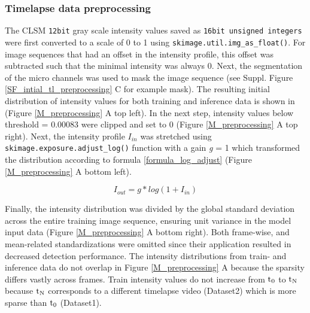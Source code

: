 \subsubsection{Timelapse data preprocessing}
The CLSM \verb|12bit| gray scale intensity values saved as 
\verb|16bit unsigned integers| were first converted to a scale of 0 to 1 using 
\verb|skimage.util.img_as_float()|. For image sequences that had an offset in 
the intensity profile, this offset was subtracted such that the minimal 
intensity was always 0. Next, the segmentation of the micro channels 
was used to mask the image sequence (see Suppl. Figure 
\ref{SF_intial_tl_preprocessing} C for example mask). The resulting initial 
distribution of intensity values for both training and inference data is shown 
in  (Figure \ref{M_preprocessing} A top left). In the next step, intensity 
values below threshold = 0.00083 were clipped and set to 0 (Figure 
\ref{M_preprocessing} A top right). Next, the intensity profile $I_{in}$ was 
stretched using \verb|skimage.exposure.adjust_log()| function with a 
gain  \textit{g} = 1 which transformed the distribution according to formula 
\ref{formula_log_adjust} (Figure \ref{M_preprocessing} A bottom left). 

\begin{equation}
    I_{out} = g*log(1 + I_{in})
    \label{formula_log_adjust}
\end{equation}

Finally, the intensity distribution was divided by the global standard deviation
across the entire training image sequence, ensuring unit variance in the model
input data (Figure \ref{M_preprocessing} A bottom right). Both frame-wise, and
mean-related standardizations were omitted since their application resulted in
decreased detection performance. The intensity distributions from train- and
inference data do not overlap in Figure \ref{M_preprocessing} A because
the sparsity differs vastly across frames. Train intensity values do not
increase from $\rm t_0$ to $\rm t_N$ because $\rm t_N$ corresponds to a
different timelapse video (Dataset2) which is more sparse than $\rm t_0$
(Dataset1).

